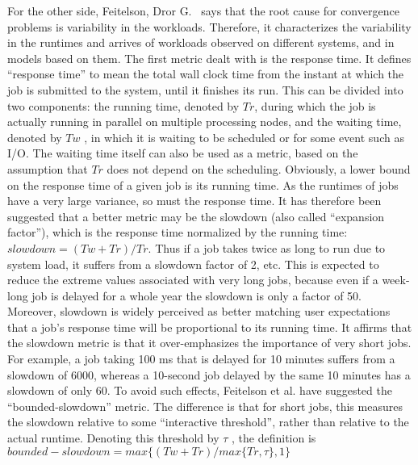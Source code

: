 For the other side, Feitelson, Dror G.~\cite{job_metrics} says that the root cause for convergence problems is variability in the workloads. Therefore, it characterizes the variability in the runtimes and arrives of workloads observed on different systems, and in models based on them. The first metric dealt with is the response time. It defines “response time” to mean the total wall clock time from the instant at which the job is submitted to the system, until it finishes its run. This can be divided into two components: the running time, denoted by $Tr$, during which the job is actually running in parallel on multiple processing nodes, and the waiting time, denoted by $Tw$ , in which it is waiting to be scheduled or for some event such as I/O. The  waiting time itself can also be used as a metric, based on the assumption that $Tr$ does not depend on the scheduling. Obviously, a lower bound on the response time of a given job is its running time. As the runtimes of jobs have a very large variance, so must the response time.
It has therefore been suggested that a better metric may be the slowdown (also called “expansion factor”), which is the response time normalized by the running time: $slowdown = (Tw + Tr) / Tr$. 
Thus if a job takes twice as long to run due to system load, it suffers from a slowdown factor of 2, etc. This is expected to reduce the extreme values associated with very long jobs, because even if a week-long job is delayed for a whole year the slowdown is only a factor of 50. Moreover, slowdown is widely perceived as better matching user expectations that a job’s response time will be proportional to its running time. 
It affirms that the slowdown metric is that it over-emphasizes the importance of very short jobs. 
For example, a job taking 100 ms that is delayed for 10 minutes suffers from a slowdown of 6000, whereas a 10-second job delayed by the same 10 minutes has a slowdown of only 60.
To avoid such effects, Feitelson et al. have suggested the “bounded-slowdown” metric. 
The difference is that for short jobs, this measures the slowdown relative to some “interactive threshold”, rather than relative to the actual runtime. 
Denoting this threshold by $τ$ , the definition is $bounded-slowdown = max \{(Tw + Tr) / max\{Tr,τ\} , 1\}$

